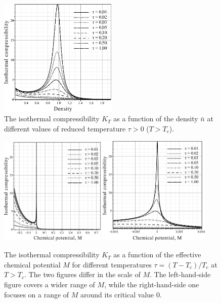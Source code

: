 \documentclass[12pt]{article}
\begin{document}
	\begin{figure}[h!]
		\centering \includegraphics[width=0.5\textwidth]{f2a.pdf}
		\vskip-3mm\caption{The isothermal compressibility $K_T$ as a function of the density $\bar n$ at different values of reduced temperature $\tau > 0$ ($T > T_c$). 
		}\label{fig2a}
	\end{figure}
	
	\begin{figure}[h!]
		\centering \includegraphics[width=0.45\textwidth]{f2b.pdf}
		\includegraphics[width=0.475\textwidth]{f2c.pdf}
		\vskip-3mm\caption{The isothermal compressibility $K_T$ as a function of the effective chemical potential $M$ for different temperatures $\tau = (T - T_c)/T_c$ at $T > T_c$. The two figures differ in the scale of $M$. The left-hand-side figure covers a wider range of $M$, while the right-hand-side one focuses on a range of $M$ around its critical value $0$.
		}\label{fig2b}
	\end{figure}
	
\end{document}
